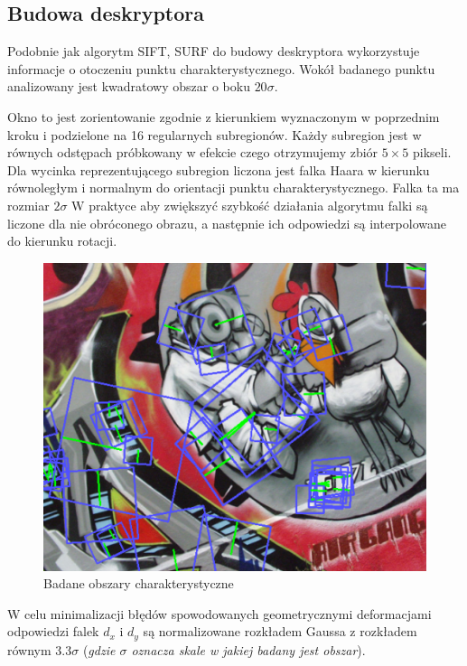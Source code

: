 \subsection{Budowa deskryptora}
Podobnie jak algorytm SIFT, SURF do budowy deskryptora wykorzystuje informacje o otoczeniu punktu charakterystycznego. Wokół badanego punktu analizowany jest kwadratowy obszar o boku $20\sigma$. 

Okno to jest zorientowanie zgodnie z kierunkiem wyznaczonym w poprzednim kroku i podzielone na 16 regularnych subregionów. Każdy subregion jest w równych odstępach próbkowany w efekcie czego otrzymujemy zbiór $5\times5$ pikseli. Dla wycinka reprezentującego subregion liczona jest falka Haara w kierunku równoległym i normalnym do orientacji punktu charakterystycznego.  Falka ta ma rozmiar $2\sigma$ W praktyce aby zwiększyć szybkość działania algorytmu falki są liczone dla nie obróconego obrazu, a następnie ich odpowiedzi są interpolowane do kierunku rotacji. 
\begin{figure}[!htb]
\centering
\includegraphics[scale=0.8]{pict/02/surf/surf_bay_example.png}
\caption{Badane obszary charakterystyczne}
\label{fig:surf_bay_example}
\end{figure}
W celu minimalizacji błędów spowodowanych geometrycznymi deformacjami odpowiedzi falek $d_x$ i $d_y$ są normalizowane rozkładem Gaussa z rozkładem równym $3.3\sigma$ (\textit{gdzie $\sigma$ oznacza skale w jakiej badany jest obszar}).

